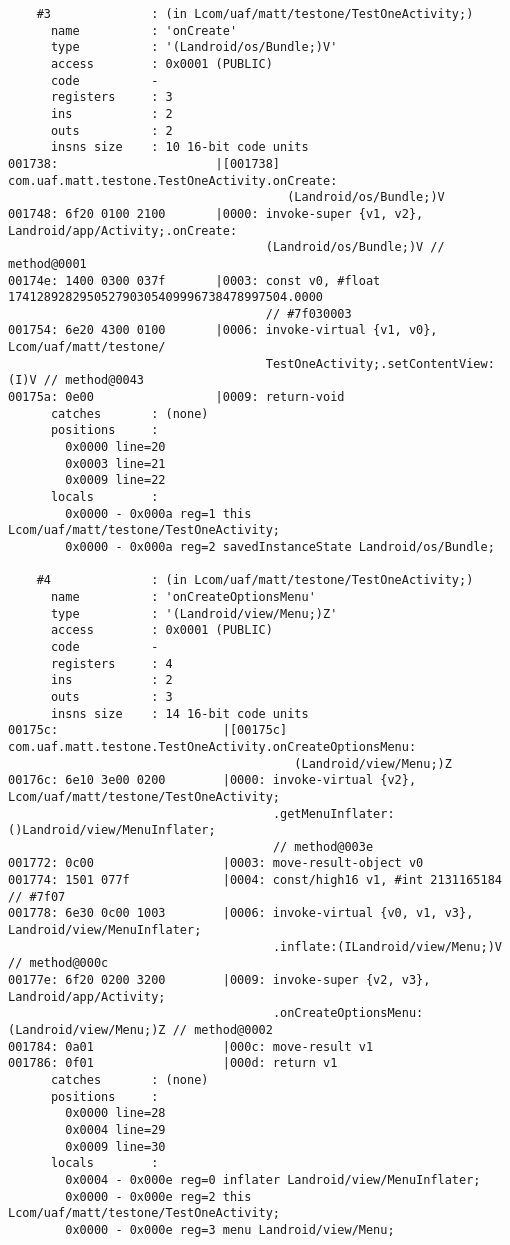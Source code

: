 \begin{lstlisting}
    #3              : (in Lcom/uaf/matt/testone/TestOneActivity;)
      name          : 'onCreate'
      type          : '(Landroid/os/Bundle;)V'
      access        : 0x0001 (PUBLIC)
      code          -
      registers     : 3
      ins           : 2
      outs          : 2
      insns size    : 10 16-bit code units
001738:                      |[001738] com.uaf.matt.testone.TestOneActivity.onCreate:
                                       (Landroid/os/Bundle;)V
001748: 6f20 0100 2100       |0000: invoke-super {v1, v2}, Landroid/app/Activity;.onCreate:
                                    (Landroid/os/Bundle;)V // method@0001
00174e: 1400 0300 037f       |0003: const v0, #float 174128928295052790305409996738478997504.0000
                                    // #7f030003
001754: 6e20 4300 0100       |0006: invoke-virtual {v1, v0}, Lcom/uaf/matt/testone/
                                    TestOneActivity;.setContentView:(I)V // method@0043
00175a: 0e00                 |0009: return-void
      catches       : (none)
      positions     :
        0x0000 line=20
        0x0003 line=21
        0x0009 line=22
      locals        :
        0x0000 - 0x000a reg=1 this Lcom/uaf/matt/testone/TestOneActivity;
        0x0000 - 0x000a reg=2 savedInstanceState Landroid/os/Bundle;

    #4              : (in Lcom/uaf/matt/testone/TestOneActivity;)
      name          : 'onCreateOptionsMenu'
      type          : '(Landroid/view/Menu;)Z'
      access        : 0x0001 (PUBLIC)
      code          -
      registers     : 4
      ins           : 2
      outs          : 3
      insns size    : 14 16-bit code units
00175c:                       |[00175c] com.uaf.matt.testone.TestOneActivity.onCreateOptionsMenu:
                                        (Landroid/view/Menu;)Z
00176c: 6e10 3e00 0200        |0000: invoke-virtual {v2}, Lcom/uaf/matt/testone/TestOneActivity;
                                     .getMenuInflater:()Landroid/view/MenuInflater;
                                     // method@003e
001772: 0c00                  |0003: move-result-object v0
001774: 1501 077f             |0004: const/high16 v1, #int 2131165184 // #7f07
001778: 6e30 0c00 1003        |0006: invoke-virtual {v0, v1, v3}, Landroid/view/MenuInflater;
                                     .inflate:(ILandroid/view/Menu;)V // method@000c
00177e: 6f20 0200 3200        |0009: invoke-super {v2, v3}, Landroid/app/Activity;
                                     .onCreateOptionsMenu:(Landroid/view/Menu;)Z // method@0002
001784: 0a01                  |000c: move-result v1
001786: 0f01                  |000d: return v1
      catches       : (none)
      positions     :
        0x0000 line=28
        0x0004 line=29
        0x0009 line=30
      locals        :
        0x0004 - 0x000e reg=0 inflater Landroid/view/MenuInflater;
        0x0000 - 0x000e reg=2 this Lcom/uaf/matt/testone/TestOneActivity;
        0x0000 - 0x000e reg=3 menu Landroid/view/Menu;


\end{lstlisting}
